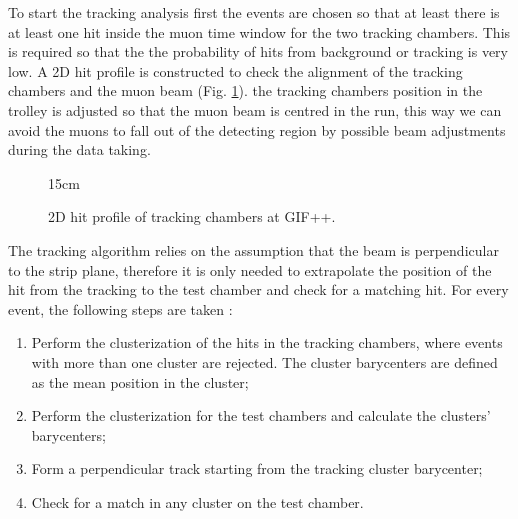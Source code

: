 To start the tracking analysis first the events are chosen so that at least there is at least one hit inside the muon time window for the two tracking chambers. This is required so that the the probability of hits from background or tracking is very low. A 2D hit profile is constructed to check the alignment of the tracking chambers and the muon beam (Fig. \ref{fig:2D_hit_profile}). the tracking chambers position in the trolley is adjusted so that the muon beam is centred in the run, this way we can avoid the muons to fall out of the detecting region by possible beam adjustments during the data taking. 

\begin{figure}[!htm]{15cm}
\caption{2D hit profile of tracking chambers at GIF++.}%
\label{fig:2D_hit_profile}
\end{figure}

The tracking algorithm relies on the assumption that the beam is perpendicular to the strip plane, therefore it is only needed to extrapolate the position of the hit from the tracking to the test chamber and check for a matching hit. For every event, the following steps are taken \cite{https://doi.org/10.48550/arxiv.2211.16591}:
\begin{enumerate}
    \item Perform the clusterization of the hits in the tracking chambers, where events with more than one cluster are rejected. The cluster barycenters are defined as the mean position in the cluster;
    \item Perform the clusterization for the test chambers and calculate the clusters' barycenters;
    \item Form a perpendicular track starting from the tracking cluster barycenter;
    \item Check for a match in any cluster on the test chamber. 
\end{enumerate}

